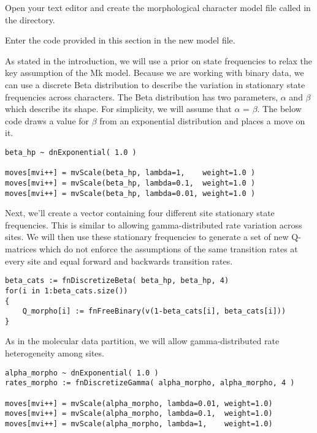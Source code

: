 {\begin{framed}
Open your text editor and create the morphological character model file called {\textcolor{red}{}} in the  directory.

Enter the \Rev code provided in this section in the new model file.
\end{framed}}

As stated in the introduction, we will use a prior on state frequencies to relax the key assumption of the Mk model. 
Because we are working with binary data, we can use a discrete Beta distribution to describe the variation in stationary state frequencies across characters. 
The Beta distribution has two parameters, $\alpha$ and $\beta$ which describe its shape. 
For simplicity, we will assume that $\alpha$ = $\beta$. 
The below code draws a value for $\beta$ from an exponential distribution and places a move on it.

{\tt \begin{snugshade*}
\begin{lstlisting}
beta_hp ~ dnExponential( 1.0 )

moves[mvi++] = mvScale(beta_hp, lambda=1,    weight=1.0 )
moves[mvi++] = mvScale(beta_hp, lambda=0.1,  weight=1.0 )
moves[mvi++] = mvScale(beta_hp, lambda=0.01, weight=1.0 )
\end{lstlisting}
\end{snugshade*}}

Next, we'll create a vector containing four different site stationary state frequencies. 
This is similar to allowing gamma-distributed rate variation across sites. 
We will then use these stationary frequencies to generate a set of new Q-matrices which do not enforce the assumptions of the same transition rates at every site and equal forward and backwards transition rates.

{\tt \begin{snugshade*}
\begin{lstlisting}
beta_cats := fnDiscretizeBeta( beta_hp, beta_hp, 4)
for(i in 1:beta_cats.size())
{
    Q_morpho[i] := fnFreeBinary(v(1-beta_cats[i], beta_cats[i]))
}
\end{lstlisting}
\end{snugshade*}}


As in the molecular data partition, we will allow gamma-distributed rate heterogeneity among sites.
{\tt \begin{snugshade*}
\begin{lstlisting}
alpha_morpho ~ dnExponential( 1.0 )
rates_morpho := fnDiscretizeGamma( alpha_morpho, alpha_morpho, 4 )

moves[mvi++] = mvScale(alpha_morpho, lambda=0.01, weight=1.0)
moves[mvi++] = mvScale(alpha_morpho, lambda=0.1,  weight=1.0)
moves[mvi++] = mvScale(alpha_morpho, lambda=1,    weight=1.0)
\end{lstlisting}
\end{snugshade*}}

